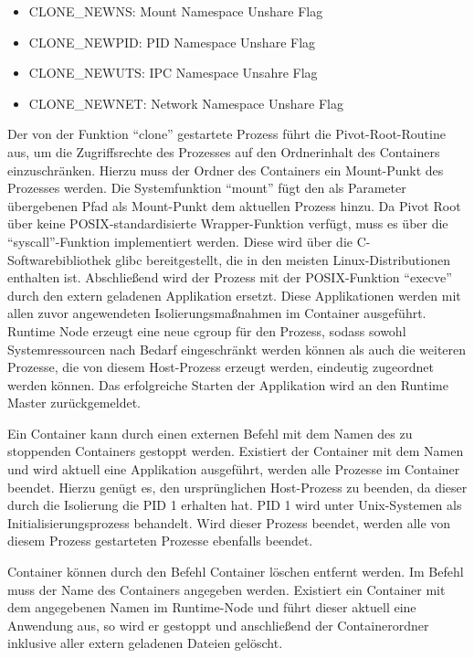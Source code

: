 \begin{itemize}
    \item CLONE\_NEWNS: Mount Namespace Unshare Flag
    \item CLONE\_NEWPID: PID Namespace Unshare Flag
    \item CLONE\_NEWUTS: IPC Namespace Unsahre Flag
    \item CLONE\_NEWNET: Network Namespace Unshare Flag
\end{itemize}

Der von der Funktion \enquote{clone} gestartete Prozess führt die Pivot-Root-Routine aus, um die Zugriffsrechte des Prozesses auf den Ordnerinhalt des Containers einzuschränken. Hierzu muss der Ordner des Containers ein Mount-Punkt des Prozesses werden. Die Systemfunktion \enquote{mount} fügt den als Parameter übergebenen Pfad als Mount-Punkt dem aktuellen Prozess hinzu. Da Pivot Root über keine \gls{POSIX}-standardisierte Wrapper-Funktion verfügt, muss es über die \enquote{syscall}-Funktion implementiert werden. Diese wird über die C-Softwarebibliothek glibc bereitgestellt, die in den meisten Linux-Distributionen enthalten ist. Abschließend wird der Prozess mit der \gls{POSIX}-Funktion \enquote{execve} durch den extern geladenen Applikation ersetzt.  Diese Applikationen werden mit allen zuvor angewendeten Isolierungsmaßnahmen im Container ausgeführt. Runtime Node erzeugt eine neue cgroup für den Prozess, sodass sowohl Systemressourcen nach Bedarf eingeschränkt werden können als auch die weiteren Prozesse, die von diesem Host-Prozess erzeugt werden, eindeutig zugeordnet werden können. Das erfolgreiche Starten der Applikation wird an den Runtime Master zurückgemeldet. 

Ein Container kann durch einen externen Befehl mit dem Namen des zu stoppenden Containers gestoppt werden. Existiert der Container mit dem Namen und wird aktuell eine Applikation ausgeführt, werden alle Prozesse im Container beendet. Hierzu genügt es, den ursprünglichen Host-Prozess zu beenden, da dieser durch die Isolierung die PID 1 erhalten hat. PID 1 wird unter Unix-Systemen als Initialisierungsprozess behandelt. Wird dieser Prozess beendet, werden alle von diesem Prozess gestarteten Prozesse ebenfalls beendet.

Container können durch den Befehl Container löschen entfernt werden. Im Befehl muss der Name des Containers angegeben werden. Existiert ein Container mit dem angegebenen Namen im Runtime-Node und führt dieser aktuell eine Anwendung aus, so wird er gestoppt und anschließend der Containerordner inklusive aller extern geladenen Dateien gelöscht.

